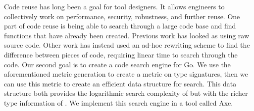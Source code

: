 Code reuse has long been a goal for tool designers.
It allows engineers to collectively work on performance, security, robustness, and further reuse.
One part of code reuse is being able to search through a large code base and find functions that have already been created.
Previous work \cite{cox} has looked as using raw source code.
Other work \cite{mitchell:hoogle_16_may_2011} has instead used an ad-hoc rewriting scheme to find the difference between pieces of code,
requiring linear time to search through the code.
Our second goal is to create a code search engine for Go.
We use the aforementioned metric generation to create a metric on type signatures,
then we can use this metric to create an efficient data structure for search.
This data structure both provides the logarithmic search complexity of \cite{cox} but with the richer type information of \cite{mitchell:hoogle_16_may_2011}.
We implement this search engine in a tool called Axe.

